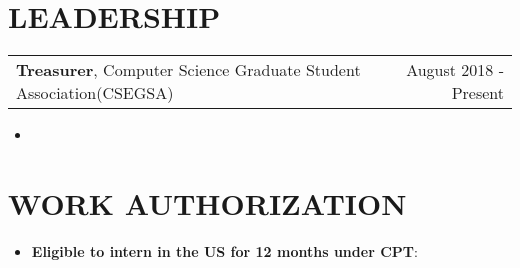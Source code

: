 \documentclass[12pt]{article}
\makeatletter
\newcommand{\resumeItemSmall}[2]{
  \item\small{
    \textbf{#1}{: #2 \vspace{-2pt}}
  }
}
\newcommand{\resumeExpHeading}[3]{
    \vspace{-1pt}
    \begin{tabular*}{\textwidth}{l@{\extracolsep{\fill}}r}
      \textbf{\large#1}{#2} & #3 \\
    \end{tabular*}
}
\newcommand{\resumeSubItemSmall}[2]{\resumeItemSmall{#1}{#2}\vspace{-4pt}}
\newcommand{\resumeSubHeadingListStart}{\begin{itemize}[leftmargin=*]}
\newcommand{\resumeSubHeadingListEnd}{\end{itemize}}
\newcommand{\normalListItem}[1]{\item{#1}\vspace{-6pt}}
\makeatother
\begin{document}
%
\section{LEADERSHIP}

    \resumeExpHeading
      {Treasurer}{, Computer Science Graduate Student Association(CSEGSA)}{August 2018 - Present}
      \resumeSubHeadingListStart
        \normalListItem
          \small{Responsible for overseeing and presenting budgets, accounts and financial statements of the association}
        \resumeSubHeadingListEnd

\section{WORK AUTHORIZATION}
  \resumeSubHeadingListStart
    \resumeSubItemSmall{Eligible to intern in the US for 12 months under CPT}{}
  \resumeSubHeadingListEnd
\end{document}
